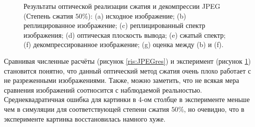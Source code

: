 \begin{figure}[h]
	\caption{Результаты оптической реализации сжатия и декомпрессии JPEG (Степень сжатия $50\%$): (a) исходное изображение; (b) реплицированное изображение; (c) реплицированный спектр изображения; (d) оптическая плоскость вывода; (e) сжатый спектр; (f) декомпрессированное изображение; (g) оценка между (b) и (f).}
	\label{ris:JPEGres2}
\end{figure}
Сравнивая численные расчёты (рисунок \ref{ris:JPEGres}) и эксперимент (рисунок \ref{ris:JPEGres2}) становится понятно, что данный оптический метод сжатия очень плохо работает с не разреженными изображениями. Также, можно заметить, что не всякая мера сравнения изображений соотносится с наблюдаемой реальностью. Среднеквадратичная ошибка для картинки в 4-ом столбце в эксперименте меньше чем в симуляции для соответствующей степени сжатия $50\%$, но очевидно, что в эксперименте картинка восстановилась намного хуже.

